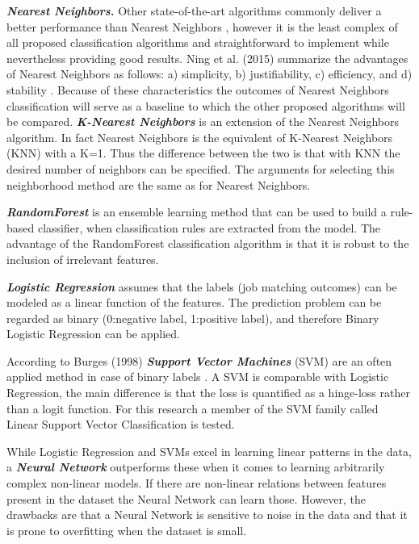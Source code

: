 \textbf{\textit{Nearest Neighbors.}}
Other state-of-the-art algorithms commonly deliver a better performance than Nearest Neighbors \cite{koren2008factorization, takacs2007major}, however it is the least complex of all proposed classification algorithms and straightforward to implement while nevertheless providing good results.
Ning et al. (2015) summarize the advantages of Nearest Neighbors as follows: a) simplicity, b) justifiability, c) efficiency, and d) stability \cite{ning2015comprehensive}.
Because of these characteristics the outcomes of Nearest Neighbors classification will serve as a baseline to which the other proposed algorithms will be compared.
\textbf{\textit{K-Nearest Neighbors}} \cite{altman1992introduction} is an extension of the Nearest Neighbors algorithm. 
In fact Nearest Neighbors is the equivalent of K-Nearest Neighbors (KNN) with a K=1. 
Thus the difference between the two is that with KNN the desired number of neighbors can be specified.
The arguments for selecting this neighborhood method are the same as for Nearest Neighbors.

\textbf{\textit{RandomForest}} \cite{breiman2001random} is an ensemble learning method that can be used to build a rule-based classifier, when classification rules are extracted from the model.
The advantage of the RandomForest classification algorithm is that it is robust to the inclusion of irrelevant features.

\textbf{\textit{Logistic Regression}} \cite{hosmer2013applied} assumes that the labels (job matching outcomes) can be modeled as a linear function of the features.
The prediction problem can be regarded as binary (0:negative label, 1:positive label), and therefore Binary Logistic Regression can be applied.

According to Burges (1998) \textbf{\textit{Support Vector Machines}} (SVM) are an often applied method in case of binary labels \cite{burges1998tutorial}.
A SVM is comparable with Logistic Regression, the main difference is that the loss is quantified as a hinge-loss rather than a logit function. 
For this research a member of the SVM family called Linear Support Vector Classification is tested.

While Logistic Regression and SVMs excel in learning linear patterns in the data, a \textbf{\textit{Neural Network}} \cite{bishop1995neural} outperforms these when it comes to learning arbitrarily complex non-linear models.
If there are non-linear relations between features present in the dataset the Neural Network can learn those.
However, the drawbacks are that a Neural Network is sensitive to noise in the data and that it is prone to overfitting when the dataset is small. 

